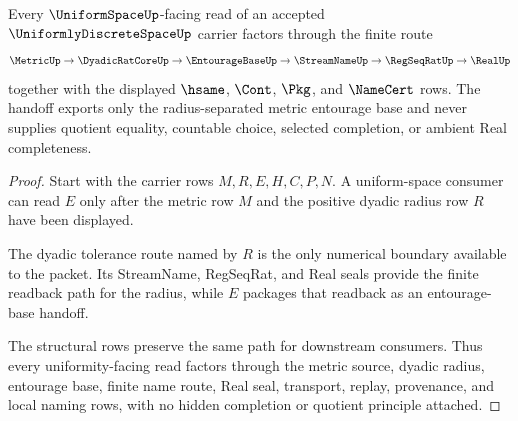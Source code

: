 \begin{theorem}
\label{thm:uniformly-discrete-space-uniformity-handoff}
Every $\UniformSpaceUp$-facing read of an accepted $\UniformlyDiscreteSpaceUp$ carrier factors through the finite route
$$
\MetricUp \to \DyadicRatCoreUp \to \EntourageBaseUp \to \StreamNameUp \to \RegSeqRatUp \to \RealUp
$$
together with the displayed $\hsame$, $\Cont$, $\Pkg$, and $\NameCert$ rows. The handoff exports only the radius-separated metric entourage base and never supplies quotient equality, countable choice, selected completion, or ambient Real completeness.
\end{theorem}
\begin{proof}
Start with the carrier rows $M,R,E,H,C,P,N$. A uniform-space consumer can read $E$ only after the metric row $M$ and the positive dyadic radius row $R$ have been displayed.

The dyadic tolerance route named by $R$ is the only numerical boundary available to the packet. Its StreamName, RegSeqRat, and Real seals provide the finite readback path for the radius, while $E$ packages that readback as an entourage-base handoff.

The structural rows preserve the same path for downstream consumers. Thus every uniformity-facing read factors through the metric source, dyadic radius, entourage base, finite name route, Real seal, transport, replay, provenance, and local naming rows, with no hidden completion or quotient principle attached.
\end{proof}


\begin{closurestatus}{\UniformlyDiscreteSpaceUp}
  \theoryclosure{\seedClosure}
  \formalstatus{\unformalizedV}
\end{closurestatus}
